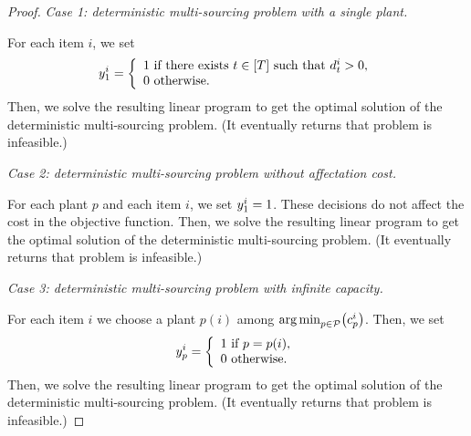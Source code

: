 \begin{proof}
\emph{Case 1: deterministic multi-sourcing problem with a single plant.}

For each item $i$, we set
$$
\open_1^i=
\left\{
\begin{array}{l}
1\mbox{ if there exists }t\in\range{\horizon}\mbox{ such that }\demand_t^i>0,\\
0\mbox{ otherwise}.
\end{array}
\right.
$$
Then, we solve the resulting linear program to get the optimal solution of the deterministic multi-sourcing problem.
(It eventually returns that problem is infeasible.)

\medskip

\emph{Case 2: deterministic multi-sourcing problem without affectation cost.}

For each plant $p$ and each item $i$, we set $y_1^i=1$.
These decisions do not affect the cost in the objective function.
Then, we solve the resulting linear program to get the optimal solution of the deterministic multi-sourcing problem.
(It eventually returns that problem is infeasible.)

\medskip

\emph{Case 3: deterministic multi-sourcing problem with infinite capacity.}

For each item $i$ we choose a plant $p(i)$ among $\argmin_{p\in\plants}\bracket{\affect_p^i}$.
Then, we set
$$
\open_p^i=
\left\{
\begin{array}{l}
1\mbox{ if }p=p(i),\\
0\mbox{ otherwise}.
\end{array}
\right.
$$
Then, we solve the resulting linear program to get the optimal solution of the deterministic multi-sourcing problem.
(It eventually returns that problem is infeasible.)
\end{proof}



